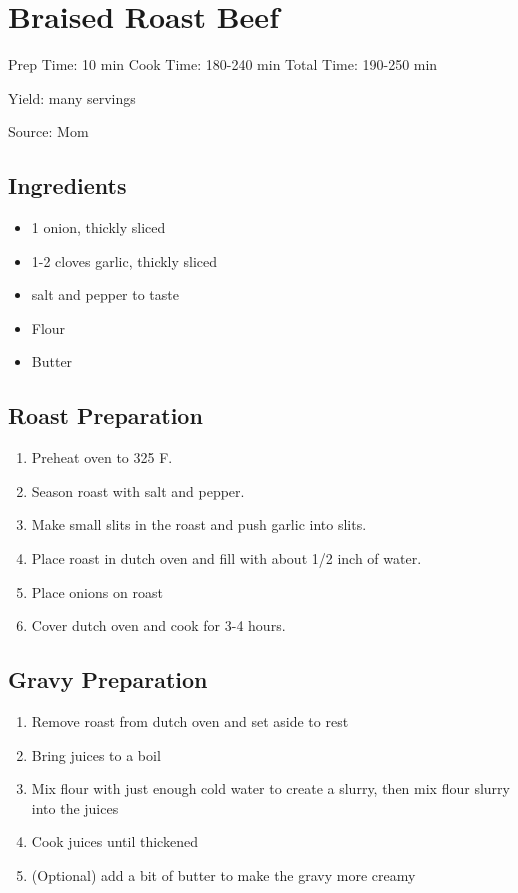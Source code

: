 \section{Braised Roast Beef}

\begin{center}
Prep Time: 10 min
Cook Time: 180-240 min
Total Time: 190-250 min

\noindent Yield: many servings

\vspace{1em}

Source: Mom
\end{center}

\subsection{Ingredients}
\begin{multicols}{2}
\begin{itemize}
    \item 1 onion, thickly sliced
    \item 1-2 cloves garlic, thickly sliced
    \item salt and pepper to taste
    \item Flour
    \item Butter
\end{itemize}
\end{multicols}

\subsection{Roast Preparation}
\begin{enumerate}
    \item Preheat oven to 325 F.
    \item Season roast with salt and pepper.
    \item Make small slits in the roast and push garlic into slits.
    \item Place roast in dutch oven and fill with about 1/2 inch of water.
    \item Place onions on roast
    \item Cover dutch oven and cook for 3-4 hours.
\end{enumerate}

\subsection{Gravy Preparation}
\begin{enumerate}
    \item Remove roast from dutch oven and set aside to rest
    \item Bring juices to a boil
    \item Mix flour with just enough cold water to create a slurry, then mix flour slurry into the juices
    \item Cook juices until thickened
    \item (Optional) add a bit of butter to make the gravy more creamy
\end{enumerate}

